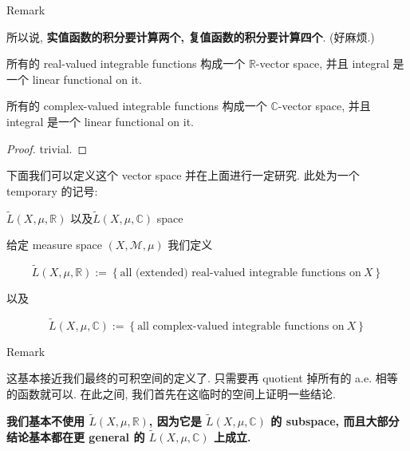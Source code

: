 \documentclass{qlnotes-export}
\begin{document}
\begin{qlremark}{Remark}

所以说, \textbf{实值函数的积分要计算两个, 复值函数的积分要计算四个}. (好麻烦.)

\end{qlremark}

\begin{proposition}\label{prop-05-integration-of-real-and-complex-functions-proposition-001}

所有的 real-valued integrable functions 构成一个 \(\mathbb{R}\)-vector space, 并且 integral 是一个 linear functional on it.

所有的 complex-valued integrable functions 构成一个 \(\mathbb{C}\)-vector space, 并且 integral 是一个 linear functional on it.

\end{proposition}

\begin{proof}

trivial.

\end{proof}

下面我们可以定义这个 vector space 并在上面进行一定研究. 此处为一个 temporary 的记号:

\begin{definition}{\(\widetilde{L}(X,\mu,{\mathbb{R}})\)
以及\(\widetilde{L}(X,\mu,{\mathbb{C}})\) space}\label{def-05-integration-of-real-and-complex-functions-tilde-l-x-mu-mathbb-r-tilde-l-x-mu-mathbb-c-space}

给定 measure space \((X,\mathcal{M},\mu)\) 我们定义

\[\widetilde{L}(X,\mu,{\mathbb{R}}) := \left\{ {\text{all (extended) real-valued integrable functions on}\ X} \right\}\]

以及

\[\widetilde{L}(X,\mu,{\mathbb{C}}) := \left\{ {\text{all complex-valued integrable functions on}\ X} \right\}\]

\end{definition}

\begin{qlremark}{Remark}

这基本接近我们最终的可积空间的定义了. 只需要再 quotient 掉所有的 a.e. 相等的函数就可以. 在此之间, 我们首先在这临时的空间上证明一些结论.

\textbf{我们基本不使用 \(\widetilde{L}(X,\mu,{\mathbb{R}})\), 因为它是 \(\widetilde{L}(X,\mu,{\mathbb{C}})\) 的 subspace, 而且大部分结论基本都在更 general 的 \(\widetilde{L}(X,\mu,{\mathbb{C}})\) 上成立.}

\end{qlremark}
\end{document}
